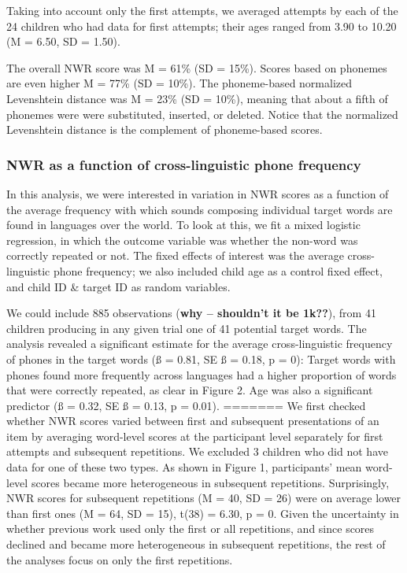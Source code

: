 \documentclass[english,,man,floatsintext]{apa6}
\begin{document}
Taking into account only the first attempts, we averaged attempts by each of the 24 children who had data for first attempts; their ages ranged from 3.90 to 10.20 (M = 6.50, SD = 1.50).

The overall NWR score was M = 61\% (SD = 15\%). Scores based on phonemes are even higher M = 77\% (SD = 10\%). The phoneme-based normalized Levenshtein distance was M = 23\% (SD = 10\%), meaning that about a fifth of phonemes were were substituted, inserted, or deleted. Notice that the normalized Levenshtein distance is the complement of phoneme-based scores.

\hypertarget{nwr-as-a-function-of-cross-linguistic-phone-frequency}{%
\subsubsection{NWR as a function of cross-linguistic phone frequency}\label{nwr-as-a-function-of-cross-linguistic-phone-frequency}}

In this analysis, we were interested in variation in NWR scores as a function of the average frequency with which sounds composing individual target words are found in languages over the world. To look at this, we fit a mixed logistic regression, in which the outcome variable was whether the non-word was correctly repeated or not. The fixed effects of interest was the average cross-linguistic phone frequency; we also included child age as a control fixed effect, and child ID \& target ID as random variables.

We could include 885 observations (\textbf{why -- shouldn't it be 1k??}), from 41 children producing in any given trial one of 41 potential target words. The analysis revealed a significant estimate for the average cross-linguistic frequency of phones in the target words (ß = 0.81, SE ß = 0.18, p = 0): Target words with phones found more frequently across languages had a higher proportion of words that were correctly repeated, as clear in Figure 2. Age was also a significant predictor (ß = 0.32, SE ß = 0.13, p = 0.01).
=======
We first checked whether NWR scores varied between first and subsequent
presentations of an item by averaging word-level scores at the
participant level separately for first attempts and subsequent
repetitions. We excluded 3 children who did not have data for one of
these two types. As shown in Figure 1, participants' mean word-level
scores became more heterogeneous in subsequent repetitions.
Surprisingly, NWR scores for subsequent repetitions (M = 40, SD = 26)
were on average lower than first ones (M = 64, SD = 15), t(38) = 6.30, p
= 0. Given the uncertainty in whether previous work used only the first
or all repetitions, and since scores declined and became more
heterogeneous in subsequent repetitions, the rest of the analyses focus
on only the first repetitions.
\end{document}

